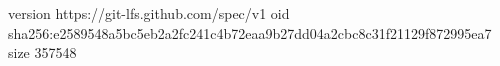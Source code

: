 version https://git-lfs.github.com/spec/v1
oid sha256:e2589548a5bc5eb2a2fc241c4b72eaa9b27dd04a2cbc8c31f21129f872995ea7
size 357548
